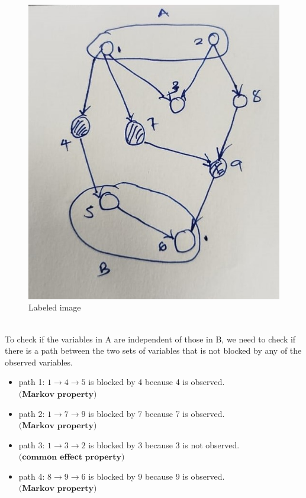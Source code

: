 \documentclass[a3paper,12pt]{extarticle} %
\begin{document}
\begin{enumerate}
\begin{figure}[h!]
\begin{minipage}{0.48\textwidth}
            \includegraphics[width=\linewidth]{dseperation_1_labelled.jpg}
            \caption{Labeled image}
            \label{fig:example_image2}
        \end{minipage}
    \end{figure}
    \\
    To check if the variables in A are independent of those in B, we need to check if there is a path between the two sets of variables that is not blocked by any of the observed variables.
    \begin{itemize}
        \item path 1: \(1 \rightarrow 4 \rightarrow 5\) is blocked by 4 because 4 is observed. \(\textbf{(Markov property)}\)
        \item path 2: \(1 \rightarrow 7 \rightarrow 9\) is blocked by 7 because 7 is observed. \(\textbf{(Markov property)}\)
        \item path 3: \(1 \rightarrow 3 \rightarrow 2\) is blocked by 3 because 3 is not observed. \(\textbf{(common effect property)}\)
        \item path 4: \(8 \rightarrow 9 \rightarrow 6\) is blocked by 9 because 9 is  observed. \(\textbf{(Markov property)}\)

\end{itemize}
\end{enumerate}
\end{document}
